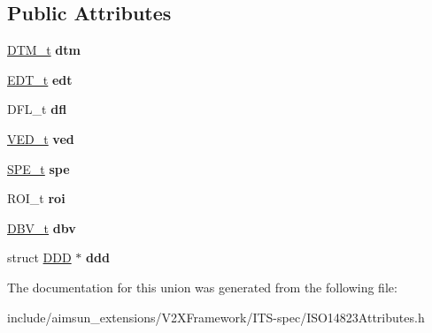 \subsection*{Public Attributes}
\begin{DoxyCompactItemize}
\item 
\hyperlink{structDTM}{D\+T\+M\+\_\+t} {\bfseries dtm}\hypertarget{unionISO14823Attributes____Member_1_1ISO14823Attributes____Member__u_a20964c9915024ec6a1ec0b33dd82c0df}{}\label{unionISO14823Attributes____Member_1_1ISO14823Attributes____Member__u_a20964c9915024ec6a1ec0b33dd82c0df}

\item 
\hyperlink{structDTM}{E\+D\+T\+\_\+t} {\bfseries edt}\hypertarget{unionISO14823Attributes____Member_1_1ISO14823Attributes____Member__u_a7430473a7bb1760833cb8b6cc9a188c2}{}\label{unionISO14823Attributes____Member_1_1ISO14823Attributes____Member__u_a7430473a7bb1760833cb8b6cc9a188c2}

\item 
D\+F\+L\+\_\+t {\bfseries dfl}\hypertarget{unionISO14823Attributes____Member_1_1ISO14823Attributes____Member__u_a38e98d0dcc6d685aeb200611eeeca33d}{}\label{unionISO14823Attributes____Member_1_1ISO14823Attributes____Member__u_a38e98d0dcc6d685aeb200611eeeca33d}

\item 
\hyperlink{structVED}{V\+E\+D\+\_\+t} {\bfseries ved}\hypertarget{unionISO14823Attributes____Member_1_1ISO14823Attributes____Member__u_a1152d77ad2667fe8117469ec2ae29810}{}\label{unionISO14823Attributes____Member_1_1ISO14823Attributes____Member__u_a1152d77ad2667fe8117469ec2ae29810}

\item 
\hyperlink{structSPE}{S\+P\+E\+\_\+t} {\bfseries spe}\hypertarget{unionISO14823Attributes____Member_1_1ISO14823Attributes____Member__u_adae9bfb83276d5c4c9cc52631102c242}{}\label{unionISO14823Attributes____Member_1_1ISO14823Attributes____Member__u_adae9bfb83276d5c4c9cc52631102c242}

\item 
R\+O\+I\+\_\+t {\bfseries roi}\hypertarget{unionISO14823Attributes____Member_1_1ISO14823Attributes____Member__u_a5cdd377dab9aa9a1fd7c551848ed20b7}{}\label{unionISO14823Attributes____Member_1_1ISO14823Attributes____Member__u_a5cdd377dab9aa9a1fd7c551848ed20b7}

\item 
\hyperlink{structDistance}{D\+B\+V\+\_\+t} {\bfseries dbv}\hypertarget{unionISO14823Attributes____Member_1_1ISO14823Attributes____Member__u_a99853553170bd29a00801fd5edc7452f}{}\label{unionISO14823Attributes____Member_1_1ISO14823Attributes____Member__u_a99853553170bd29a00801fd5edc7452f}

\item 
struct \hyperlink{structDDD}{D\+DD} $\ast$ {\bfseries ddd}\hypertarget{unionISO14823Attributes____Member_1_1ISO14823Attributes____Member__u_a96ee83a6c75d7959da5609b122f5cb19}{}\label{unionISO14823Attributes____Member_1_1ISO14823Attributes____Member__u_a96ee83a6c75d7959da5609b122f5cb19}

\end{DoxyCompactItemize}


The documentation for this union was generated from the following file\+:\begin{DoxyCompactItemize}
\item 
include/aimsun\+\_\+extensions/\+V2\+X\+Framework/\+I\+T\+S-\/spec/I\+S\+O14823\+Attributes.\+h\end{DoxyCompactItemize}
